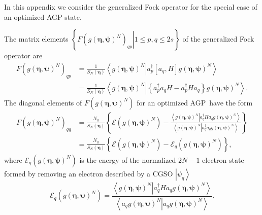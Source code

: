 \documentclass[aps,preprint]{revtex4}%
\begin{document}
In this appendix we consider the generalized Fock operator for the special
case of an optimized AGP state.

The matrix elements $\left\{  \left.  F\left(  g\left(  \bm{\eta
},\bm{\psi}\right)  ^{N}\right)  _{qp}\right\vert 1\leq p,q\leq2s\right\}  $
of the generalized Fock operator are
\begin{align}
F\left(  g\left(  \bm{\eta},\bm{\psi}\right)  ^{N}\right)  _{qp}  &  =\frac
{1}{S_{N}\left(  \bm{\eta}\right)  }\left\langle \left.  g\left(
\bm{\eta},\bm{\psi}\right)  ^{N}\right\vert a_{p}^{\dagger}\left[
a_{q},H\right]  g\left(  \bm{\eta},\bm{\psi}\right)  ^{N}\right\rangle
\nonumber\\
&  =\frac{1}{S_{N}\left(  \bm{\eta}\right)  }\left\langle \left.  g\left(
\bm{\eta},\bm{\psi}\right)  ^{N}\right\vert \left\{  a_{p}^{\dagger}%
a_{q}H-a_{p}^{\dagger}Ha_{q}\right\}  g\left(  \bm{\eta},\bm{\psi }\right)
^{N}\right\rangle .
\end{align}
The diagonal elements of $F\left(  g\left(  \bm{\eta},\bm{\psi
}\right)  ^{N}\right)  $ for an optimized AGP\ have the form
\begin{align}
F\left(  g\left(  \bm{\eta},\bm{\psi}\right)  ^{N}\right)  _{qq}  &
=\frac{N_{q}}{S_{N}\left(  \bm{\eta}\right)  }\left\{  \mathcal{E}\left(
g\left(  \bm{\eta},\bm{\psi}\right)  ^{N}\right)  -\frac{\left\langle \left.
g\left(  \bm{\eta},\bm{\psi}\right)  ^{N}\right\vert a_{q}^{\dagger}%
Ha_{q}g\left(  \bm{\eta},\bm{\psi}\right)  ^{N}\right\rangle }{\left\langle
\left.  g\left(  \bm{\eta},\bm{\psi }\right)  ^{N}\right\vert a_{q}^{\dagger
}a_{q}g\left(  \bm{\eta },\bm{\psi}\right)  ^{N}\right\rangle }\right\}
\nonumber\\
&  =\frac{N_{q}}{S_{N}\left(  \bm{\eta}\right)  }\left\{  \mathcal{E}\left(
g\left(  \bm{\eta},\bm{\psi}\right)  ^{N}\right)  -\mathcal{E}_{q}\left(
g\left(  \bm{\eta},\bm{\psi}\right)  ^{N}\right)  \right\}  ,
\end{align}
where $\mathcal{E}_{q}\left(  g\left(  \bm{\eta},\bm{\psi}\right)
^{N}\right)  $ is the energy of the normalized $2N-1$ electron state formed by
removing an electron described by a CGSO $\left\vert \psi_{q}\right\rangle $
\begin{equation}
\mathcal{E}_{q}\left(  g\left(  \bm{\eta},\bm{\psi}\right)  ^{N}\right)
=\frac{\left\langle \left.  g\left(  \bm{\eta},\bm{\psi }\right)
^{N}\right\vert a_{q}^{\dagger}Ha_{q}g\left(  \bm{\eta },\bm{\psi}\right)
^{N}\right\rangle }{\left\langle \left.  a_{q}g\left(
\bm{\eta},\bm{\psi}\right)  ^{N}\right\vert a_{q}g\left(
\bm{\eta},\bm{\psi}\right)  ^{N}\right\rangle }.
\end{equation}
\end{document}
